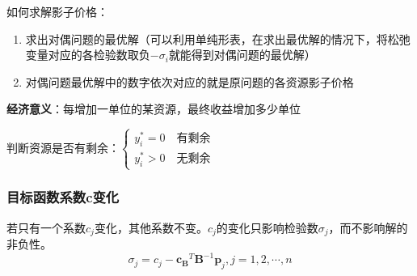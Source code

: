 \documentclass{book}
\begin{document}
如何求解影子价格：
\begin{enumerate}
    \item 求出对偶问题的最优解（可以利用单纯形表，在求出最优解的情况下，将松弛变量对应的各检验数取负$-\sigma_i$就能得到对偶问题的最优解）
    \item 对偶问题最优解中的数字依次对应的就是原问题的各资源影子价格
\end{enumerate}

\textbf{经济意义}：每增加一单位的某资源，最终收益增加多少单位

判断资源是否有剩余：$\begin{cases}
        y_i^*=0\quad \mbox{有剩余} \\
        y_i^*>0\quad \mbox{无剩余}
    \end{cases}$

\subsubsection{目标函数系数c变化\textasteriskcentered}
若只有一个系数$c_j$变化，其他系数不变。$c_j$的变化只影响检验数$\sigma_j$，而不影响解的非负性。
$$\sigma_j=c_j-\boldsymbol{c_B}^T\boldsymbol{B}^{-1}\boldsymbol{p}_j, j=1, 2, \cdots, n $$
\end{document}
